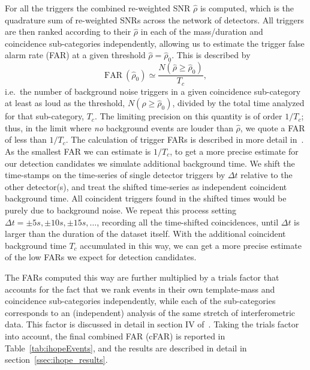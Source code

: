 For all the triggers the combined
re-weighted SNR $\hat{\rho}$ is computed, which is the quadrature sum of 
re-weighted SNRs across the network of detectors. All triggers are then 
ranked according to their $\hat{\rho}$ in each of the mass/duration and 
coincidence sub-categories independently, allowing us to estimate the 
trigger false alarm rate (FAR) at a given threshold $\hat{\rho}=\hat{\rho}_{0}$.
This is described by 
\begin{equation}\label{eq:FARdef}
\mathrm{FAR}~(\hat{\rho}_{0}) \simeq \frac{N(\hat{\rho}\geq 
\hat{\rho}_{0})}{T_{c}},
\end{equation}
i.e.\ the number of background noise triggers in a given coincidence 
sub-category at least as loud as the threshold, $N(\hat{\rho}\geq 
\hat{\rho}_0)$, divided 
by the total time analyzed for that sub-category, $T_{c}$. The limiting 
precision on this quantity is of order $1/T_c$; thus, in the limit where 
\emph{no} background events are louder than $\hat{\rho}$, we quote a FAR of 
less than $1/T_c$. The calculation of trigger FARs is described in more detail 
in~\cite{Keppel:2009,Abbott:2009tt}. As the smallest FAR we can estimate is 
$1/T_{c}$, to get a more precise estimate for our detection candidates we 
simulate additional background time.
We shift the time-stamps on the time-series of single detector triggers by
$\Delta t$ relative to the other detector(s),
and treat the shifted time-series as independent coincident background time. All 
coincident
triggers found in the shifted times would be purely due to background noise. 
We repeat this process setting $\Delta t=\pm 5s, \pm 10s, \pm 15s,\dots$, 
recording all the
time-shifted coincidences, until $\Delta t$ is larger than the duration of the 
dataset itself. 
With the additional coincident background time $T_{c}$ accumulated in this way, 
we can get a more precise estimate of the low FARs we expect for detection 
candidates. 

The FARs computed this way are further multiplied by a trials
factor that accounts for the fact that we rank events in their own 
template-mass and coincidence sub-categories independently, while each of 
the sub-categories corresponds to an (independent) analysis of the same stretch 
of interferometric data. This factor is discussed in 
detail in section IV of~\cite{Colaboration:2011np}.
Taking the trials factor into account, the final combined FAR (cFAR) is 
reported in Table~\ref{tab:ihopeEvents}, and the results are described
in detail in section~\ref{ssec:ihope_results}.

